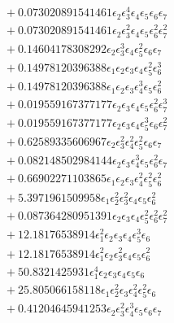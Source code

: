 \documentclass[10pt]{article}
\begin{document}
\begin{align*}
&{}  + 0.073020891541461 \epsilon_{2} \epsilon_{3}^{4} \epsilon_{4} \epsilon_{5} \epsilon_{6} \epsilon_{7} \\
&{}  + 0.073020891541461 \epsilon_{2} \epsilon_{3}^{2} \epsilon_{4} \epsilon_{5} \epsilon_{6}^{2} \epsilon_{7}^{2} \\
&{}  + 0.14604178308292 \epsilon_{2} \epsilon_{3}^{3} \epsilon_{4} \epsilon_{5}^{2} \epsilon_{6} \epsilon_{7} \\
&{}  + 0.14978120396388 \epsilon_{1} \epsilon_{2} \epsilon_{3} \epsilon_{4} \epsilon_{5}^{2} \epsilon_{6}^{3} \\
&{}  + 0.14978120396388 \epsilon_{1} \epsilon_{2} \epsilon_{3} \epsilon_{4}^{3} \epsilon_{5} \epsilon_{6}^{2} \\
&{}  + 0.019559167377177 \epsilon_{2} \epsilon_{3} \epsilon_{4} \epsilon_{5} \epsilon_{6}^{2} \epsilon_{7}^{3} \\
&{}  + 0.019559167377177 \epsilon_{2} \epsilon_{3} \epsilon_{4} \epsilon_{5}^{3} \epsilon_{6} \epsilon_{7}^{2} \\
&{}  + 0.62589335606967 \epsilon_{2} \epsilon_{3}^{2} \epsilon_{4}^{2} \epsilon_{5}^{2} \epsilon_{6} \epsilon_{7} \\
&{}  + 0.082148502984144 \epsilon_{2} \epsilon_{3} \epsilon_{4}^{3} \epsilon_{5} \epsilon_{6}^{2} \epsilon_{7} \\
&{}  + 0.66902271103865 \epsilon_{1} \epsilon_{2} \epsilon_{3} \epsilon_{4}^{2} \epsilon_{5}^{2} \epsilon_{6}^{2} \\
&{}  + 5.3971961509958 \epsilon_{1} \epsilon_{2}^{2} \epsilon_{3}^{2} \epsilon_{4} \epsilon_{5} \epsilon_{6}^{2} \\
&{}  + 0.087364280951391 \epsilon_{2} \epsilon_{3} \epsilon_{4} \epsilon_{5}^{2} \epsilon_{6}^{2} \epsilon_{7}^{2} \\
&{}  + 12.18176538914 \epsilon_{1}^{2} \epsilon_{2} \epsilon_{3} \epsilon_{4} \epsilon_{5}^{3} \epsilon_{6} \\
&{}  + 12.18176538914 \epsilon_{1}^{2} \epsilon_{2} \epsilon_{3}^{2} \epsilon_{4} \epsilon_{5} \epsilon_{6}^{2} \\
&{}  + 50.8321425931 \epsilon_{1}^{4} \epsilon_{2} \epsilon_{3} \epsilon_{4} \epsilon_{5} \epsilon_{6} \\
&{}  + 25.805066158118 \epsilon_{1} \epsilon_{2}^{2} \epsilon_{3} \epsilon_{4}^{2} \epsilon_{5}^{2} \epsilon_{6} \\
&{}  + 0.41204645941253 \epsilon_{2} \epsilon_{3}^{2} \epsilon_{4}^{3} \epsilon_{5} \epsilon_{6} \epsilon_{7} \\

\end{align*}
\end{document}
